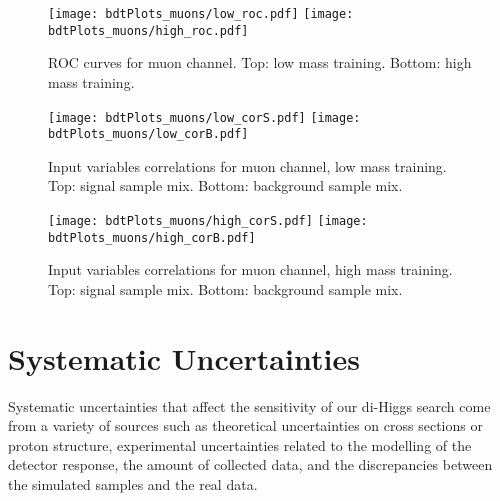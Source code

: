 \begin{figure}[tbp]
  \begin{center}
   \texttt{[image: bdtPlots\_muons/low\_roc.pdf]}
   \texttt{[image: bdtPlots\_muons/high\_roc.pdf]}
    \caption{ ROC curves for muon channel. Top: low mass training. Bottom: high mass training. }
    \label{fig:muon_ROCs}
  \end{center}
\end{figure}

\begin{figure}[tbp]
  \begin{center}
   \texttt{[image: bdtPlots\_muons/low\_corS.pdf]}
   \texttt{[image: bdtPlots\_muons/low\_corB.pdf]}
    \caption{ Input variables correlations for muon channel, low mass training. Top: signal sample mix. Bottom: background sample mix. }
    \label{fig:muon_cors_low}
  \end{center}
\end{figure}


\begin{figure}[tbp]
  \begin{center}
   \texttt{[image: bdtPlots\_muons/high\_corS.pdf]}
   \texttt{[image: bdtPlots\_muons/high\_corB.pdf]}
    \caption{ Input variables correlations for muon channel, high mass training. Top: signal sample mix. Bottom: background sample mix. }
    \label{fig:muon_cors_high}
  \end{center}
\end{figure}



\section{Systematic Uncertainties}
\label{sec:Systematics}

Systematic uncertainties that affect the sensitivity of our di-Higgs search
come from a variety of sources such as theoretical uncertainties on
cross sections or proton structure, experimental uncertainties related
to the modelling of the detector response, the amount of collected
data, and the discrepancies between the simulated samples and the real data.

